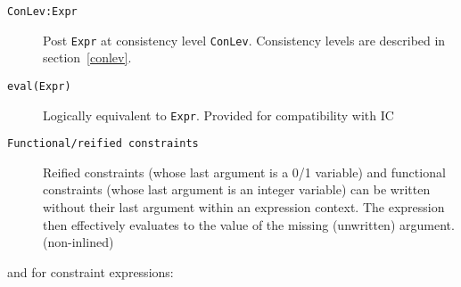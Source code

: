 \begin{description}
\item[\texttt{ConLev:Expr}]
    Post \texttt{Expr} at consistency level \texttt{ConLev}. Consistency
    levels are described in section~\ref{conlev}. 

\item[\texttt{eval(Expr)}]
            Logically equivalent to \verb'Expr'. Provided for compatibility
	    with IC

\item[\texttt{Functional/reified constraints}]
            Reified constraints (whose last argument is a 0/1 variable)
            and functional constraints (whose last argument is an integer
            variable) can be written without their last argument within
            an expression context.  The expression then effectively
            evaluates to the value of the missing (unwritten) argument.
	    (non-inlined)

\end{description}
and for constraint expressions: 


